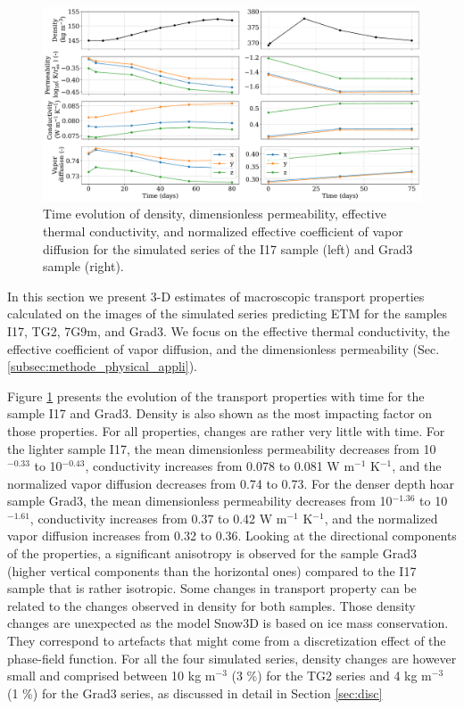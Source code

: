 \documentclass[draft,ms]{agujournal2019}
\begin{document}
\begin{figure}
    \centering
    \includegraphics[width=\linewidth]{Figures/4images_transport_temps_court.pdf}
    \caption{Time evolution of density, dimensionless permeability, effective thermal conductivity, and normalized effective coefficient of vapor diffusion for the simulated series of the I17 sample (left) and Grad3 sample (right). }
    \label{fig:transport_temps} 
\end{figure}

In this section we present 3-D estimates of macroscopic transport properties calculated on the images of the simulated series predicting ETM for the samples I17, TG2, 7G9m, and Grad3. We focus on the effective thermal conductivity, the effective coefficient of vapor diffusion, and the dimensionless permeability (Sec. \ref{subsec:methode_physical_appli}).


Figure \ref{fig:transport_temps} presents the evolution of the transport properties with time for the sample I17 and Grad3. Density is also shown as the most impacting factor on those properties.
For all properties, changes are rather very little with time.
For the lighter sample I17, the mean dimensionless permeability decreases from 10$^{-0.33}$ to 10$^{-0.43}$, conductivity increases from 0.078 to 0.081 W m$^{-1}$ K$^{-1}$, and the normalized vapor diffusion decreases from 0.74 to 0.73. For the denser depth hoar sample Grad3, the mean dimensionless permeability decreases from 10$^{-1.36}$ to 10$^{-1.61}$, conductivity increases from 0.37 to 0.42 W m$^{-1}$ K$^{-1}$, and the normalized vapor diffusion increases from 0.32 to 0.36. Looking at the directional components of the properties, a significant anisotropy is observed for the sample Grad3 (higher vertical components than the horizontal ones) compared to the I17 sample that is rather isotropic.
Some changes in transport property can be related to the changes observed in density for both samples. Those density changes are unexpected as the model Snow3D is based on ice mass conservation. They correspond to artefacts that might come from a discretization effect of the phase-field function. For all the four simulated series, density changes are however small and comprised between 10 kg m$^{-3}$ (3 \%) for the TG2 series and 4 kg m$^{-3}$ (1 \%) for the Grad3 series, as discussed in detail in Section \ref{sec:disc}
\end{document}
